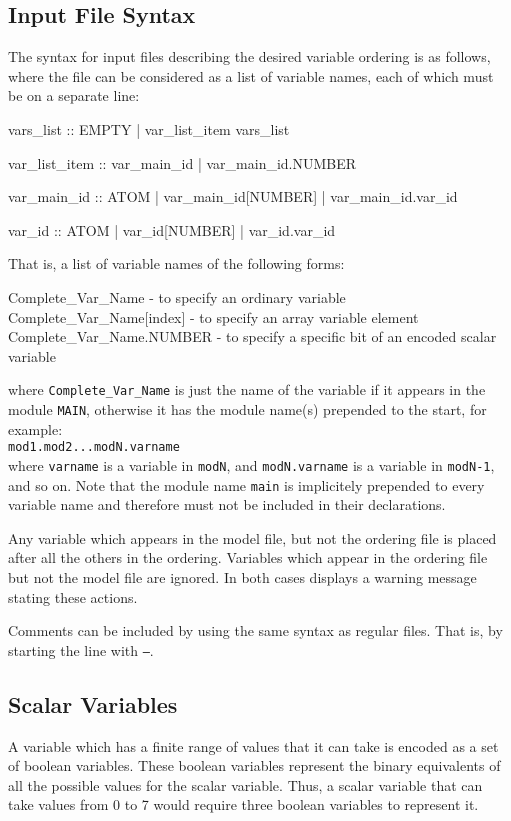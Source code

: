 \subsection{Input File Syntax}
\label{Input File Syntax}
%
The syntax for input files describing the desired variable ordering is
as follows, where the file can be considered as a list of variable
names, each of which must be on a separate line:
%
\begin{Grammar}
vars_list :: EMPTY
           | var_list_item vars_list

var_list_item :: var_main_id
               | var_main_id.NUMBER

var_main_id :: ATOM
             | var_main_id[NUMBER]
             | var_main_id.var_id

var_id :: ATOM
        | var_id[NUMBER]
        | var_id.var_id
\end{Grammar}
%
That is, a list of variable names of the following forms:
%
\begin{Grammar}
Complete_Var_Name        - to specify an ordinary variable
Complete_Var_Name[index] - to specify an array variable element
Complete_Var_Name.NUMBER - to specify a specific bit of an encoded
                           scalar variable
\end{Grammar}
%
where \texttt{Complete\_Var\_Name} is just the name of the variable if
it appears in the module \texttt{MAIN}, otherwise it has the module
name(s) prepended to the start, for example:\\

\texttt{mod1.mod2...modN.varname}\\

\noindent where \texttt{varname} is a variable in \texttt{modN}, and
\texttt{modN.varname} is a variable in \texttt{modN-1}, and so
on. Note that the module name \texttt{main} is implicitely prepended
to every variable name and therefore must not be included in their
declarations.

\noindent Any variable which appears in the model file, but not the
ordering file is placed after all the others in the
ordering. Variables which appear in the ordering file but not the
model file are ignored. In both cases \nusmv displays a warning
message stating these actions.

Comments can be included by using the same syntax as regular \nusmv
files. That is, by starting the line with \texttt{--}.


\subsection{Scalar Variables}
\label{Scalar Variables}
%
A variable which has a finite range of values that it can take is
encoded as a set of boolean variables. These boolean variables
represent the binary equivalents of all the possible values for the
scalar variable. Thus, a scalar variable that can take values from 0
to 7 would require three boolean variables to represent it.

